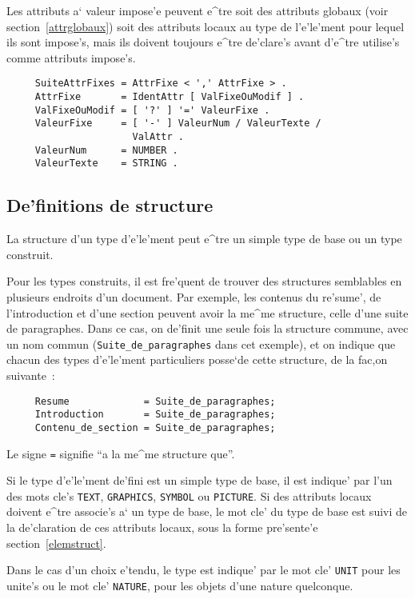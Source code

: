 {Les attributs a` valeur impose'e peuvent e^tre soit des attributs globaux
(voir section~\ref{attrglobaux}) soit des attributs locaux au type de
l'e'le'ment pour lequel ils sont impose's, mais ils doivent toujours e^tre
de'clare's avant d'e^tre utilise's comme attributs impose's.


\begin{verbatim}
     SuiteAttrFixes = AttrFixe < ',' AttrFixe > .
     AttrFixe       = IdentAttr [ ValFixeOuModif ] .
     ValFixeOuModif = [ '?' ] '=' ValeurFixe .
     ValeurFixe     = [ '-' ] ValeurNum / ValeurTexte /
                      ValAttr .
     ValeurNum      = NUMBER .
     ValeurTexte    = STRING .
\end{verbatim}

\subsection{De'finitions de structure}
\label{defstruct}

La structure d'un type d'e'le'ment peut e^tre un simple type de base ou
un type construit.

Pour les types construits, il est fre'quent de trouver des structures
semblables en plusieurs endroits d'un document. Par exemple, les contenus du
re'sume', de l'introduction et d'une section peuvent avoir la me^me structure,
celle d'une suite de paragraphes. Dans ce cas, on de'finit une seule fois la
structure commune, avec un nom commun ({\tt Suite\_de\_paragraphes} dans cet
exemple), et on indique que chacun des types d'e'le'ment particuliers
posse`de cette structure, de la fac,on suivante~:

\begin{verbatim}
     Resume             = Suite_de_paragraphes;
     Introduction       = Suite_de_paragraphes;
     Contenu_de_section = Suite_de_paragraphes;
\end{verbatim}
Le signe {\tt =} signifie ``a la me^me structure que''.

Si le type d'e'le'ment de'fini est un simple type de base, il est indique'
par l'un des mots cle's {\tt TEXT}, {\tt GRAPHICS}, {\tt SYMBOL} ou
{\tt PICTURE}. Si des attributs locaux doivent e^tre associe's a` un type
de base, le mot cle' du type de base est suivi de la de'claration de ces
attributs locaux, sous la forme pre'sente'e section~\ref{elemstruct}.

Dans le cas d'un choix e'tendu, le type est indique' par le mot cle'
{\tt UNIT} pour les unite's ou le mot cle' {\tt NATURE}, pour les objets
d'une nature quelconque.

}
